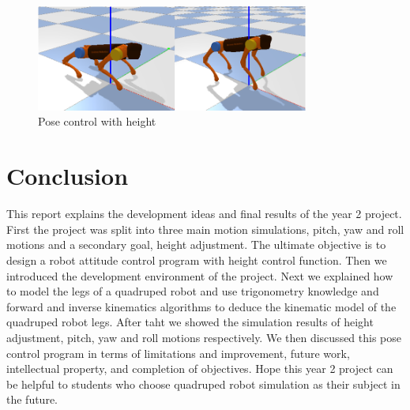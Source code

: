 \begin{figure}[htbp]
   \centering
   \includegraphics[width=0.8\textwidth]{figures/Pose_control_with_height.png}
   \caption{Pose control with height}
   \label{fig: Pose_control_with_height}
\end{figure}


\chapter{Conclusion}

This report explains the development ideas and final results of the year 2 project. First the project was split into three main motion simulations, pitch, yaw and roll motions and a secondary goal, height adjustment. The ultimate objective is to design a robot attitude control program with height control function. Then we introduced the development environment of the project. Next we explained how to model the legs of a quadruped robot and use trigonometry knowledge and forward and inverse kinematics algorithms to deduce the kinematic model of the quadruped robot legs. After taht we showed the simulation results of height adjustment, pitch, yaw and roll motions respectively. We then discussed this pose control program in terms of limitations and improvement, future work, intellectual property, and completion of objectives. Hope this year 2 project can be helpful to students who choose quadruped robot simulation as their subject in the future.
